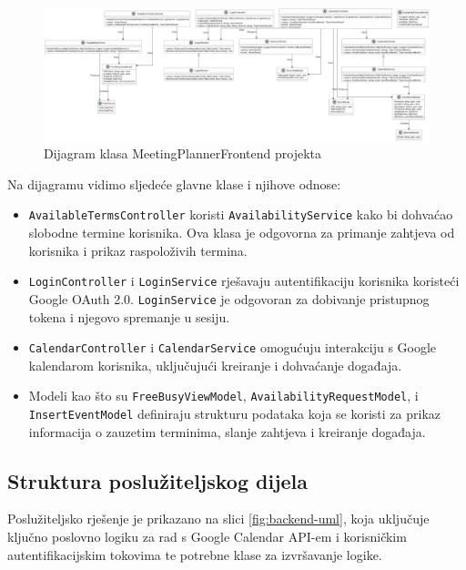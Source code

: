 \documentclass{foi}
\begin{document}
\begin{figure}[H]
    \centering
    \includegraphics[width=1\textwidth]{slike/MeetingPlannerFrontend_ClassUML.png}
    \caption{Dijagram klasa MeetingPlannerFrontend projekta}
    \label{fig:frontend-uml}
\end{figure}

Na dijagramu vidimo sljedeće glavne klase i njihove odnose:
\begin{itemize}
    \item \texttt{AvailableTermsController} koristi \texttt{AvailabilityService} kako bi dohvaćao slobodne termine korisnika. Ova klasa je odgovorna za primanje zahtjeva od korisnika i prikaz raspoloživih termina.
    \item \texttt{LoginController} i \texttt{LoginService} rješavaju autentifikaciju korisnika koristeći Google OAuth 2.0. \texttt{LoginService} je odgovoran za dobivanje pristupnog tokena i njegovo spremanje u sesiju.
    \item \texttt{CalendarController} i \texttt{CalendarService} omogućuju interakciju s Google kalendarom korisnika, uključujući kreiranje i dohvaćanje događaja.
    \item Modeli kao što su \texttt{FreeBusyViewModel}, \texttt{AvailabilityRequestModel}, i \texttt{InsertEventModel} definiraju strukturu podataka koja se koristi za prikaz informacija o zauzetim terminima, slanje zahtjeva i kreiranje događaja.
\end{itemize}

\subsection{Struktura poslužiteljskog dijela}

Poslužiteljsko rješenje je prikazano na slici \ref{fig:backend-uml}, koja uključuje ključno poslovno logiku za rad s Google Calendar API-em i korisničkim autentifikacijskim tokovima te potrebne klase za izvršavanje logike.
\end{document}
